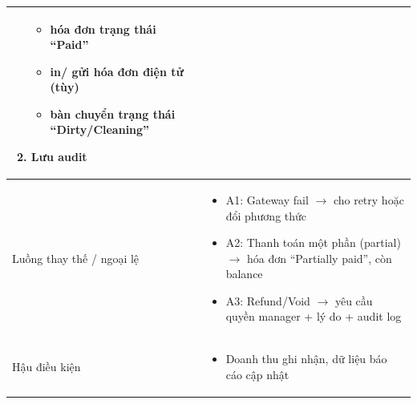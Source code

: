 \begin{longtable}{|>{\raggedright\arraybackslash}p{}|>{\raggedright\arraybackslash}p{}|}
\begin{enumerate}[leftmargin=*]
\begin{itemize}[leftmargin=*]
\item hóa đơn trạng thái “Paid”
\item in/ gửi hóa đơn điện tử (tùy)
\item bàn chuyển trạng thái “Dirty/Cleaning”
\end{itemize}
\vspace{-0.5em}
\item Lưu audit
\end{enumerate}
\vspace{-0.5em}
\\
\hline
Luồng thay thế / ngoại lệ &
\vspace{-0.5em}
\begin{itemize}[leftmargin=*]
\item A1: Gateway fail $\rightarrow$ cho retry hoặc đổi phương thức
\item A2: Thanh toán một phần (partial) $\rightarrow$ hóa đơn “Partially paid”, còn balance
\item A3: Refund/Void $\rightarrow$ yêu cầu quyền manager + lý do + audit log
\end{itemize}
\vspace{-0.5em}
\\
\hline
Hậu điều kiện &
\vspace{-0.5em}
\begin{itemize}[leftmargin=*]
\item Doanh thu ghi nhận, dữ liệu báo cáo cập nhật
\end{itemize}
\vspace{-0.5em}
\\
\hline
\end{longtable}

